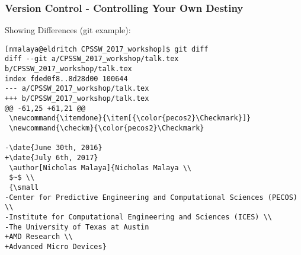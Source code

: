\documentclass[mathserif]{beamer}
\newcommand{\itemdone}{\item[{\color{pecos2}\Checkmark}]}
\newcommand{\checkm}{\color{pecos2}\Checkmark}
\begin{document}
%
%
\begin{frame}[fragile]
\frametitle{Version Control - Controlling Your Own Destiny}

\begin{block}{Showing Differences (git example):}
\begin{scriptsize}
\begin{verbatim}
[nmalaya@eldritch CPSSW_2017_workshop]$ git diff
diff --git a/CPSSW_2017_workshop/talk.tex b/CPSSW_2017_workshop/talk.tex
index fded0f8..8d28d00 100644
--- a/CPSSW_2017_workshop/talk.tex
+++ b/CPSSW_2017_workshop/talk.tex
@@ -61,25 +61,21 @@
 \newcommand{\itemdone}{\item[{\color{pecos2}\Checkmark}]}
 \newcommand{\checkm}{\color{pecos2}\Checkmark}
 
-\date{June 30th, 2016}
+\date{July 6th, 2017}
 \author[Nicholas Malaya]{Nicholas Malaya \\
 $~$ \\
 {\small
-Center for Predictive Engineering and Computational Sciences (PECOS) \\
-Institute for Computational Engineering and Sciences (ICES) \\
-The University of Texas at Austin
+AMD Research \\
+Advanced Micro Devices}
\end{verbatim}
\end{scriptsize}
\end{block}
\end{frame}
\end{document}
